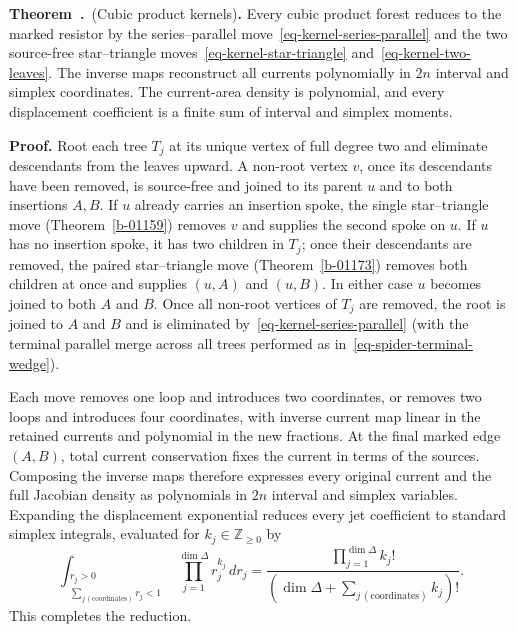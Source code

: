 \documentclass[11pt]{article}
\numberwithin{equation}{section}
\numberwithin{figure}{section}
\numberwithin{table}{section}
\newcounter{rthmc}[section]
\renewcommand{\therthmc}{\thesection.\arabic{rthmc}}
\newcommand{\rthm}[3]{\par\needspace{3\baselineskip}\addvspace{\medskipamount}\noindent\refstepcounter{rthmc}\label{#2}\textbf{#1~\therthmc}\if\relax\detokenize{#3}\relax\else\ (#3)\fi\textbf{.}}
\begin{document}
\rthm{Theorem}{b-00405}{Cubic product kernels}
Every cubic product forest reduces to the marked resistor by the
series--parallel move~\eqref{eq-kernel-series-parallel} and the two source-free star--triangle moves~\eqref{eq-kernel-star-triangle} and~\eqref{eq-kernel-two-leaves}.
The inverse maps reconstruct all currents polynomially in $2n$ interval
and simplex coordinates. The current-area density is polynomial, and
every displacement coefficient is a finite sum of interval and simplex
moments.

\begin{proofbox}
\textbf{Proof.} Root each tree $T_j$ at its unique vertex of full degree two and eliminate descendants from the leaves upward. A non-root vertex $v$, once its descendants have been removed, is source-free and joined to its parent $u$ and to both insertions $A,B$.
If $u$ already carries an insertion spoke, the single star--triangle move (Theorem~\ref{b-01159}) removes $v$ and supplies the second spoke on $u$. If $u$ has no insertion spoke, it has two children in $T_j$; once their descendants are removed, the paired star--triangle move (Theorem~\ref{b-01173}) removes both children at once and supplies $(u,A)$ and $(u,B)$. In either case $u$ becomes joined to both $A$ and $B$. Once all non-root vertices of $T_j$ are removed, the root is joined to $A$ and $B$ and is eliminated by~\eqref{eq-kernel-series-parallel} (with the terminal parallel merge across all trees performed as in~\eqref{eq-spider-terminal-wedge}).

Each move removes one loop and introduces two coordinates, or removes two loops and introduces four coordinates, with inverse current map linear in the retained currents and polynomial in the new fractions. At the final marked edge $(A,B)$, total current conservation fixes the current in terms of the sources. Composing the inverse maps therefore expresses every original current and the full Jacobian density as polynomials in $2n$ interval and simplex variables. Expanding the displacement exponential reduces every jet coefficient to standard simplex integrals, evaluated for $k_j\in\mathbb Z_{\ge0}$ by
\begin{equation}\label{eq-Dirichlet}
\int_{\substack{r_j>0\\\sum_{j\,\mathrm{(coordinates)}}r_j<1}}
\prod_{j=1}^{\dim\Delta}r_j^{k_j}\,dr_j
=\frac{\prod_{j=1}^{\dim\Delta}k_j!}
{\left(\dim\Delta+\sum_{j\,\mathrm{(coordinates)}}k_j\right)!}.
\end{equation}
This completes the reduction.~\hfill\qedsymbol
\end{proofbox}
\end{document}
